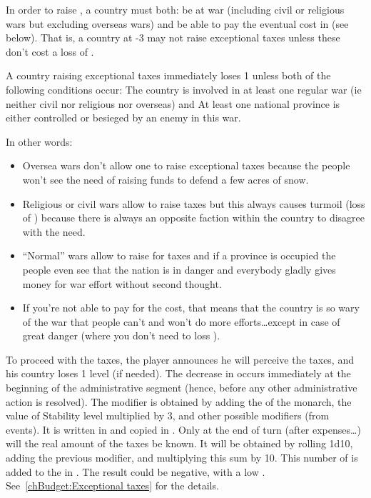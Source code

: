 \aparag[Condition] In order to raise , a country must
both:
\bparag be at war (including civil or religious wars but excluding overseas
wars) and
\bparag be able to pay the eventual cost in \STAB (see below). That is, a
country at -3 \STAB may not raise exceptional taxes unless these don't cost a
loss of \STAB.

 A country raising exceptional taxes immediately loses 1
\STAB unless both of the following conditions occur:
\bparag The country is involved in at least one regular war (ie neither civil
nor religious nor overseas) and
\bparag At least one national province is either controlled or besieged by an
enemy in this war.

\begin{designnote}
  In other words:
  \begin{itemize}
  \item Oversea wars don't allow one to raise exceptional taxes because the
    people won't see the need of raising funds to defend a few acres of snow.
  \item Religious or civil wars allow to raise taxes but this always causes
    turmoil (loss of \STAB) because there is always an opposite faction within
    the country to disagree with the need.
  \item ``Normal'' wars allow to raise for taxes and if a province is occupied
    the people even see that the nation is in danger and everybody gladly
    gives money for war effort without second thought.
  \item If you're not able to pay for the \STAB cost, that means that the
    country is so wary of the war that people can't and won't do more
    efforts\ldots except in case of great danger (where you don't need to loss
    \STAB).
  \end{itemize}
\end{designnote}

\aparag To proceed with the taxes, the player announces he will perceive the
taxes, and his country loses 1 \STAB level (if needed). The decrease in \STAB
occurs immediately at the beginning of the administrative segment (hence,
before any other administrative action is resolved).
\bparag The modifier is obtained by adding the \ADM of the monarch, the value
of Stability level multiplied by 3, and other possible modifiers (from
events). It is written in  and
copied in .
\bparag Only at the end of turn (after expenses\ldots) will the real amount of
the taxes be known. It will be obtained by rolling 1d10, adding the previous
modifier, and multiplying this sum by 10. This number of \Ducats is added to
the \RT in .
\bparag The result could be negative, with a low \STAB.
\bparag See~\ref{chBudget:Exceptional taxes} for the details.

